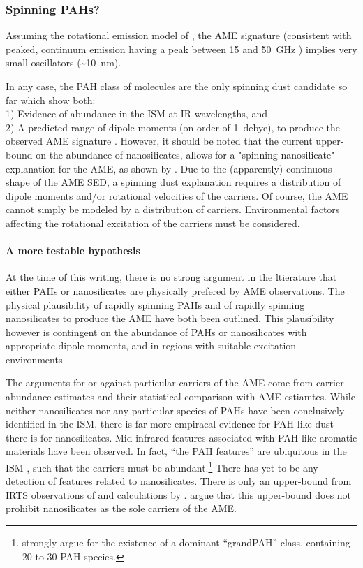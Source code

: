 \begin{center}
     \subsubsection{Spinning PAHs?}
       Assuming the rotational emission model of \cite{draine98b}, the AME signature (consistent with peaked, continuum emission having a peak between 15 and 50~GHz ) implies very small oscillators (\textasciitilde{}10~nm).

       In any case, the PAH class of molecules are the only spinning dust candidate so far which show both: \\
       1) Evidence of abundance in the ISM at IR wavelengths, and \\
       2) A predicted range of dipole moments (on order of 1~debye), to produce the observed AME signature \citep{draine98b, lovas05, thorwirth07}. However, it should be noted that the current upper-bound on the abundance of nanosilicates, allows for a "spinning nanosilicate" explanation for the AME, as shown by \cite{hensley17a}. Due to the (apparently) continuous shape of the AME SED, a spinning dust explanation requires a distribution of dipole moments and/or rotational velocities of the carriers. Of course, the AME cannot simply be modeled by a distribution of carriers. Environmental factors affecting the rotational excitation of the carriers must be considered.

       \paragraph{A more testable hypothesis}
         At the time of this writing, there is no strong argument in the ltierature that either PAHs or nanosilicates are physically prefered by AME observations. The physical plausibility of rapidly spinning PAHs and of rapidly spinning nanosilicates to produce the AME have both been outlined. This plausibility however is contingent on the abundance of PAHs or nanosilicates with appropriate dipole moments, and in regions with suitable excitation environments.

         The arguments for or against particular carriers of the AME come from carrier abundance estimates and their statistical comparison with AME estiamtes. While neither nanosilicates nor any particular species of PAHs have been conclusively identified in the ISM, there is far more empiracal evidence for PAH-like dust there is for nanosilicates. Mid-infrared features associated with PAH-like aromatic materials have been observed. In fact, ``the PAH features'' are ubiquitous in the ISM \citep{giard94,onaka96,onaka00}, such that the carriers must be abundant.\footnote{ \cite{andrews15} strongly argue for the  existence of a dominant ``grandPAH'' class, containing 20 to 30 PAH species.} There has yet to be any detection of features related to nanosilicates. There is only an upper-bound from IRTS observations of \cite{onaka96} and calculations by \cite{li01}. \cite{hensley17a} argue that this upper-bound does not prohibit nanosilicates as the sole carriers of the AME.


\end{center}
